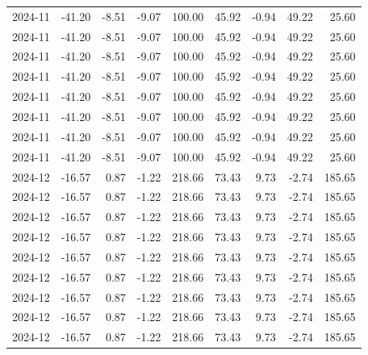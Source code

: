 \begin{table}[ht]
\begin{tabular}{lrrrrrrrr}
  2024-11 & -41.20 & -8.51 & -9.07 & 100.00 & 45.92 & -0.94 & 49.22 & 25.60 \\ 
  2024-11 & -41.20 & -8.51 & -9.07 & 100.00 & 45.92 & -0.94 & 49.22 & 25.60 \\ 
  2024-11 & -41.20 & -8.51 & -9.07 & 100.00 & 45.92 & -0.94 & 49.22 & 25.60 \\ 
  2024-11 & -41.20 & -8.51 & -9.07 & 100.00 & 45.92 & -0.94 & 49.22 & 25.60 \\ 
  2024-11 & -41.20 & -8.51 & -9.07 & 100.00 & 45.92 & -0.94 & 49.22 & 25.60 \\ 
  2024-11 & -41.20 & -8.51 & -9.07 & 100.00 & 45.92 & -0.94 & 49.22 & 25.60 \\ 
  2024-11 & -41.20 & -8.51 & -9.07 & 100.00 & 45.92 & -0.94 & 49.22 & 25.60 \\ 
  2024-11 & -41.20 & -8.51 & -9.07 & 100.00 & 45.92 & -0.94 & 49.22 & 25.60 \\ 
  2024-12 & -16.57 & 0.87 & -1.22 & 218.66 & 73.43 & 9.73 & -2.74 & 185.65 \\ 
  2024-12 & -16.57 & 0.87 & -1.22 & 218.66 & 73.43 & 9.73 & -2.74 & 185.65 \\ 
  2024-12 & -16.57 & 0.87 & -1.22 & 218.66 & 73.43 & 9.73 & -2.74 & 185.65 \\ 
  2024-12 & -16.57 & 0.87 & -1.22 & 218.66 & 73.43 & 9.73 & -2.74 & 185.65 \\ 
  2024-12 & -16.57 & 0.87 & -1.22 & 218.66 & 73.43 & 9.73 & -2.74 & 185.65 \\ 
  2024-12 & -16.57 & 0.87 & -1.22 & 218.66 & 73.43 & 9.73 & -2.74 & 185.65 \\ 
  2024-12 & -16.57 & 0.87 & -1.22 & 218.66 & 73.43 & 9.73 & -2.74 & 185.65 \\ 
  2024-12 & -16.57 & 0.87 & -1.22 & 218.66 & 73.43 & 9.73 & -2.74 & 185.65 \\ 
  2024-12 & -16.57 & 0.87 & -1.22 & 218.66 & 73.43 & 9.73 & -2.74 & 185.65 \\ 
   \hline
\end{tabular}
\end{table}

